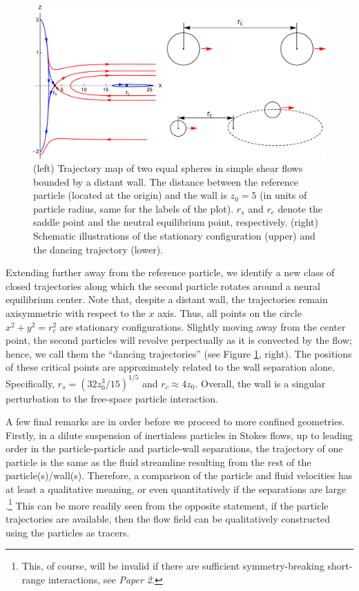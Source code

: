 \begin{figure}%
  \centering
  \includegraphics[width=\columnwidth]{itzhak-boris.pdf}
  \caption{
  (left) Trajectory map of two equal spheres in simple shear flows bounded by a distant wall. The distance between the reference particle (located at the origin) and the wall is $z_0=5$ (in units of particle radius, same for the labels of the plot). $r_s$ and $r_c$ denote the saddle point and the neutral equilibrium point, respectively.
  (right) Schematic illustrations of the stationary configuration (upper) and the dancing trajectory (lower).}
  \label{fig:itzhak-boris}
\end{figure}

Extending further away from the reference particle, we identify a new class of closed trajectories along which the second particle rotates around a neural equilibrium center. Note that, despite a distant wall, the trajectories remain axisymmetric with respect to the $x$ axis. Thus, all points on the circle $x^2+y^2=r_c^2$ are stationary configurations.
Slightly moving away from the center point, the second particles will revolve perpectually as it is convected by the flow; hence, we call them the ``dancing trajectories'' (see Figure \ref{fig:itzhak-boris}, right).
The positions of these critical points are approximately related to the wall separation alone. Specifically, $r_s=(32z_0^3/15)^{1/5}$ and $r_c \approx 4z_0$.
Overall, the wall is a singular perturbation to the free-space particle interaction.

\medskip
A few final remarks are in order before we proceed to more confined geometries.
Firstly, in a dilute suspension of inertialess particles in Stokes flows, up to leading order in the particle-particle and particle-wall separations, the trajectory of one particle is the same as the fluid streamline resulting from the rest of the particle(s)/wall(s). Therefore, a comparison of the particle and fluid velocities has at least a qualitative meaning, or even quantitatively if the separations are large \citep{zurita-gotor_2007}.\footnote{This, of course, will be invalid if there are sufficient symmetry-breaking short-range interactions, see \eg \emph{Paper 2}.}
This can be more readily seen from the opposite statement, \ie if the particle trajectories are available, then the flow field can be qualitatively constructed using the particles as tracers.

